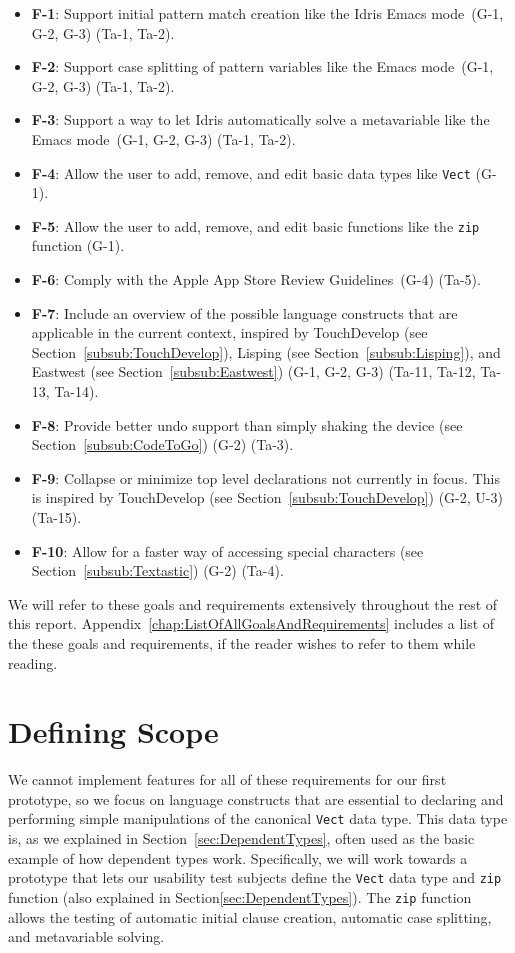\begin{itemize}
	\item \textbf{F-1}: Support initial pattern match creation like the Idris Emacs mode\,\cite{Idris:EmacsMode} (G-1, G-2, G-3)
	(Ta-1, Ta-2).
	\item \textbf{F-2}: Support case splitting of pattern variables like the Emacs mode\,\cite{Idris:EmacsMode} (G-1, G-2, G-3) (Ta-1, Ta-2).
	\item \textbf{F-3}: Support a way to let Idris automatically solve a metavariable like the Emacs mode\,\cite{Idris:EmacsMode} (G-1, G-2, G-3) (Ta-1, Ta-2).
	\item \textbf{F-4}: Allow the user to add, remove, and edit basic data types like \texttt{Vect} (G-1).
	\item \textbf{F-5}: Allow the user to add, remove, and edit basic functions like the \texttt{zip} function (G-1).
	\item \textbf{F-6}: Comply with the Apple App Store Review Guidelines\,\cite{AppStoreGuidelines} (G-4)
	(Ta-5).
	\item \textbf{F-7}: Include an overview of the possible language constructs that are applicable in the current context, inspired by TouchDevelop (see Section~\ref{subsub:TouchDevelop}), Lisping (see Section~\ref{subsub:Lisping}), and Eastwest (see Section~\ref{subsub:Eastwest}) (G-1, G-2, G-3)
	(Ta-11, Ta-12, Ta-13, Ta-14).
	\item \textbf{F-8}: Provide better undo support than simply shaking the device (see Section~\ref{subsub:CodeToGo}) (G-2)
	(Ta-3).
	\item \textbf{F-9}: Collapse or minimize top level declarations not currently in focus. This is inspired by TouchDevelop (see Section~\ref{subsub:TouchDevelop}) (G-2, U-3)
	(Ta-15).
	\item \textbf{F-10}: Allow for a faster way of accessing special characters (see Section~\ref{subsub:Textastic}) (G-2)
	(Ta-4).
\end{itemize}

We will refer to these goals and requirements extensively throughout the rest of this report. Appendix~\ref{chap:ListOfAllGoalsAndRequirements} includes a list of the these goals and requirements, if the reader wishes to refer to them while reading.

\section{Defining Scope} 
\label{sec:defining_scope}
We cannot implement features for all of these requirements for our first prototype, so we focus on language constructs that are essential to declaring and performing simple manipulations of the canonical \texttt{Vect} data type. This data type is, as we explained in Section~\ref{sec:DependentTypes}, often used as the basic example of how dependent types work.
Specifically, we will work towards a prototype that lets our usability test subjects define the \texttt{Vect} data type and \texttt{zip} function (also explained in
Section\ref{sec:DependentTypes}).
The \texttt{zip} function allows the testing of automatic initial clause creation, automatic case splitting, and metavariable solving.

